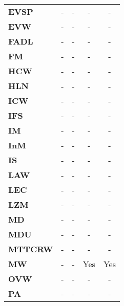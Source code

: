 \begin{table}[ht!]
\begin{tabular}{lcccc}
\textbf{EVSP}          & -                  & -            & -            & -               \\
\textbf{EVW}           & -                  & -            & -            & -               \\
\textbf{FADL}          & -                  & -            & -            & -               \\
\textbf{FM}            & -                  & -            & -            & -               \\
\textbf{HCW}           & -                  & -            & -            & -               \\
\textbf{HLN}           & -                  & -            & -            & -               \\
\textbf{ICW}           & -                  & -            & -            & -               \\
\textbf{IFS}           & -                  & -            & -            & -               \\
\textbf{IM}            & -                  & -            & -            & -               \\
\textbf{InM}           & -                  & -            & -            & -               \\
\textbf{IS}            & -                  & -            & -            & -               \\
\textbf{LAW}           & -                  & -            & -            & -               \\
\textbf{LEC}           & -                  & -            & -            & -               \\
\textbf{LZM}           & -                  & -            & -            & -               \\
\textbf{MD}            & -                  & -            & -            & -               \\
\textbf{MDU}           & -                  & -            & -            & -               \\
\textbf{MTTCRW}        & -                  & -            & -            & -               \\
\textbf{MW}            & -                  & -            & Yes          & Yes             \\
\textbf{OVW}           & -                  & -            & -            & -               \\
\textbf{PA}            & -                  & -            & -            & -               \\

\end{tabular}
\end{table}

